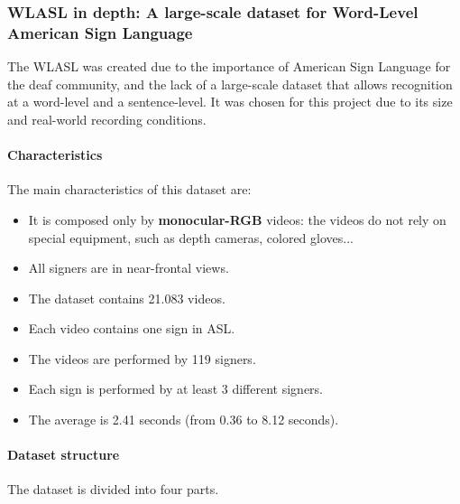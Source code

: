 \subsubsection{WLASL in depth: A large-scale dataset for Word-Level American Sign Language}
The WLASL was created due to the importance of American Sign Language for the deaf community, and the lack of a large-scale dataset that allows recognition at a word-level and a sentence-level.
It was chosen for this project due to its size and real-world recording conditions.

\paragraph{Characteristics}
The main characteristics of this dataset are:
\begin{itemize}[noitemsep]
    \item It is composed only by \textbf{monocular-RGB} videos: the videos do not rely on special equipment, such as depth cameras, colored gloves...
    \item All signers are in near-frontal views.
    \item The dataset contains 21.083 videos.
    \item Each video contains one sign in ASL.
    \item The videos are performed by 119 signers.
    \item Each sign is performed by at least 3 different signers.
    \item The average is 2.41 seconds (from 0.36 to 8.12 seconds).
\end{itemize}

\paragraph{Dataset structure}
The dataset is divided into four parts.
\begin{table}[h]
    \centering
\caption{WLASL dataset structure}
\label{table:introduction_dataset_subdivisions}
\end{table}

